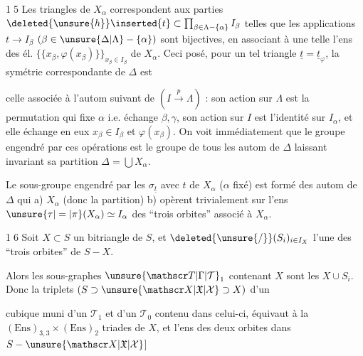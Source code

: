 
\textcircled{15} Les triangles de $X_\alpha$ correspondent aux parties $\deleted{\unsure{h}} \inserted{t}\subset\prod_{\beta\in\Lambda-\{\alpha\}} I_\beta$  telles que les applications $t\longrightarrow I_\beta$ $(\beta\in\unsure{\Delta|\Lambda}-\{\alpha\})$  sont bijectives, en associant à une telle    l'ens des él. $\{\{x_\beta,\varphi(x_\beta)\}\}_{x_\beta\in I_\beta}$ de $X_\alpha$. Ceci posé, pour un tel triangle $\underline{t}=\underline{t}_\varphi$, la symétrie correspondante de $\Delta$ est


celle associée à l'autom suivant de $(I\xrightarrow{p}\Lambda)$ : son action sur $\Lambda$ est la permutation qui fixe $\alpha$ i.e. échange $\beta,\gamma$, son action sur $I$ est l'identité sur $I_\alpha$, et elle échange en eux $x_\beta\in I_\beta$ et $\varphi(x_\beta)$. On voit immédiatement que le groupe engendré par ces opérations est le groupe de tous les autom de $\Delta$ laissant invariant sa partition $\Delta=\bigcup X_\alpha$.

 Le sous-groupe engendré par les $\sigma_{\underline t}$ avec $t$  de $X_\alpha$ ($\alpha$ fixé) est formé des autom de $\Delta$ qui a)  $X_\alpha$ (donc la partition)
b) opèrent trivialement sur l'ens $\unsure{\tau|=|\pi}(X_\alpha)\simeq I_\alpha$ des ``trois orbites'' associé à $X_\alpha$.

\textcircled{16} Soit $X\subset S$ un bitriangle de $S$, et $\deleted{\unsure{/}}(S_i)_{i\in I_X}$ l'une des ``trois orbites'' de $S-X$.

Alors les sous-graphes  $\unsure{\mathscr T|\Gamma|\mathcal T}_1$ \deleted{\unsure{$\subset$}} contenant $X$ sont les $X\cup S_i$. Donc la     triplets $(S\supset\unsure{\mathscr X|\mathfrak X|\mathcal X}\supset X)$ d'un  


cubique  muni d'un $\mathscr T_1$ et d'un $\mathscr T_0$ contenu dans celui-ci, équivaut à la    $(\mathrm{Ens})_{3,3}\times(\mathrm{Ens})_2$   \inserted{[en associant l'ens des} triades de $X$, et l'ens des deux orbites dans $S-\unsure{\mathscr X|\mathfrak X|\mathcal X}$]

